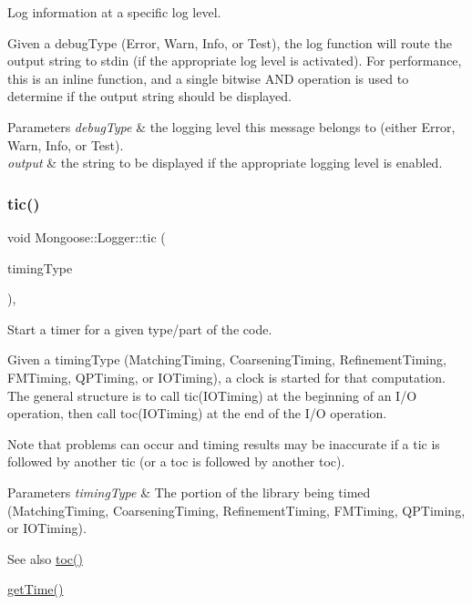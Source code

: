 Log information at a specific log level. 

Given a debug\+Type (Error, Warn, Info, or Test), the log function will route the output string to stdin (if the appropriate log level is activated). For performance, this is an inline function, and a single bitwise A\+ND operation is used to determine if the output string should be displayed.


\begin{DoxyParams}{Parameters}
{\em debug\+Type} & the logging level this message belongs to (either Error, Warn, Info, or Test). \\
\hline
{\em output} & the string to be displayed if the appropriate logging level is enabled. \\
\hline
\end{DoxyParams}
\hypertarget{class_mongoose_1_1_logger_afaa4ac7914bc5536fbe765ad2b4806d8}{}\label{class_mongoose_1_1_logger_afaa4ac7914bc5536fbe765ad2b4806d8} 
\subsubsection{\texorpdfstring{tic()}{tic()}}
{\footnotesize\ttfamily void Mongoose\+::\+Logger\+::tic (\begin{DoxyParamCaption}\item[{Timing\+Type}]{timing\+Type }\end{DoxyParamCaption})\hspace{0.3cm}{\ttfamily [inline]}, {\ttfamily [static]}}



Start a timer for a given type/part of the code. 

Given a timing\+Type (Matching\+Timing, Coarsening\+Timing, Refinement\+Timing, F\+M\+Timing, Q\+P\+Timing, or I\+O\+Timing), a clock is started for that computation. The general structure is to call tic(\+I\+O\+Timing) at the beginning of an I/O operation, then call toc(\+I\+O\+Timing) at the end of the I/O operation.

Note that problems can occur and timing results may be inaccurate if a tic is followed by another tic (or a toc is followed by another toc).


\begin{DoxyParams}{Parameters}
{\em timing\+Type} & The portion of the library being timed (Matching\+Timing, Coarsening\+Timing, Refinement\+Timing, F\+M\+Timing, Q\+P\+Timing, or I\+O\+Timing).\\
\hline
\end{DoxyParams}
\begin{DoxySeeAlso}{See also}
\hyperlink{class_mongoose_1_1_logger_af50c5bd571bfae78a27ff49b2c5bb6d3}{toc()} 

\hyperlink{class_mongoose_1_1_logger_a9f74771ff530c41f98ee090f3a1897eb}{get\+Time()} 
\end{DoxySeeAlso}
\hypertarget{class_mongoose_1_1_logger_af50c5bd571bfae78a27ff49b2c5bb6d3}{}\label{class_mongoose_1_1_logger_af50c5bd571bfae78a27ff49b2c5bb6d3} 

